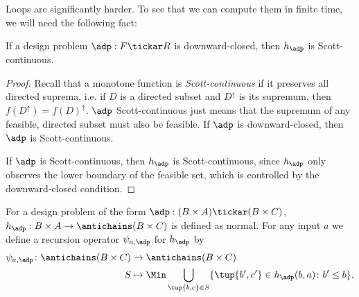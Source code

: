 Loops are significantly harder. To see that we can compute them in finite time, we will need the following fact:
\begin{lemma}
If a design problem $\adp : F \tickar R$ is downward-closed, then $h_\adp$ is Scott-continuous.
\end{lemma}

\begin{proof}
Recall that a monotone function is \emph{Scott-continuous} if it preserves all directed suprema, i.e. if $D$ is a directed subset and $D^\uparrow$ is its supremum, then $f(D^\uparrow) = f(D)^\uparrow$. $\adp$ Scott-continuous just means that the supremum of any feasible, directed subset must also be feasible. If $\adp$ is downward-closed, then $\adp$ is Scott-continuous.

 

 If $\adp$ is Scott-continuous, then $h_\adp$ is Scott-continuous, since $h_\adp$ only observes the lower boundary of the feasible set, which is controlled by the downward-closed condition.
\end{proof}

For a design problem of the form $\adp : (B \times A) \tickar (B \times C)$, $h_\adp : B \times A \to \antichains (B \times C)$ is defined as normal. For any input $a$ we define a recursion operator $\psi_{a,\adp}$ for $h_\adp$ by
\begin{equation}
\begin{aligned}
\psi_{a,\adp} \colon \antichains (B \times C) &\to \antichains (B \times C) \\
S &\mapsto \Min \bigcup_{\tup{b,c} \in S} \{ \tup{b',c'} \in h_\adp(b,a) \colon b' \leq b \}.
\end{aligned}
\end{equation}

